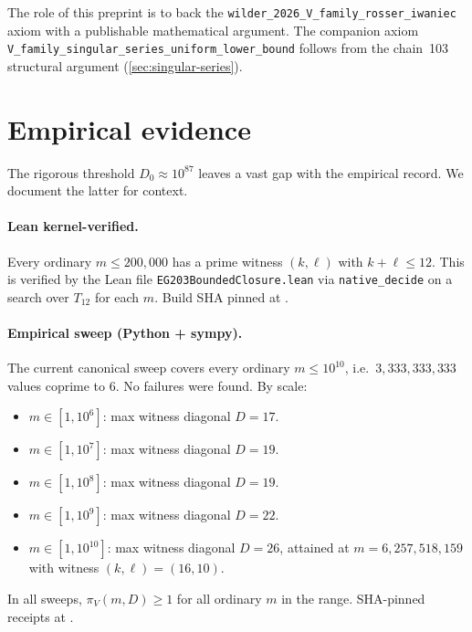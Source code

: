 \documentclass[11pt,a4paper]{article}
\theoremstyle{plain}
\theoremstyle{definition}
\theoremstyle{remark}
\begin{document}
The role of this preprint is to back the
\texttt{wilder\_2026\_V\_family\_rosser\_iwaniec} axiom with a
publishable mathematical argument. The companion axiom
\texttt{V\_family\_singular\_series\_uniform\_lower\_bound} follows
from the chain~103 structural argument
(\cref{sec:singular-series}).


\section{Empirical evidence}\label{sec:empirical}

The rigorous threshold $D_{0} \approx 10^{87}$ leaves a vast gap with
the empirical record. We document the latter for context.

\paragraph{Lean kernel-verified.}
Every ordinary $m \leq 200{,}000$ has a prime witness $(k, \ell)$
with $k + \ell \leq 12$. This is verified by the Lean file
\texttt{EG203BoundedClosure.lean} via \texttt{native\_decide} on a
search over $T_{12}$ for each $m$. Build SHA pinned at
\cite{WilderEG203Lean2026}.

\paragraph{Empirical sweep (Python + sympy).}
The current canonical sweep covers every ordinary $m \leq 10^{10}$,
i.e.\ $3{,}333{,}333{,}333$ values coprime to $6$. No failures were
found. By scale:
\begin{itemize}
  \item $m \in [1, 10^{6}]$: max witness diagonal $D = 17$.
  \item $m \in [1, 10^{7}]$: max witness diagonal $D = 19$.
  \item $m \in [1, 10^{8}]$: max witness diagonal $D = 19$.
  \item $m \in [1, 10^{9}]$: max witness diagonal $D = 22$.
  \item $m \in [1, 10^{10}]$: max witness diagonal $D = 26$, attained
    at $m = 6{,}257{,}518{,}159$ with witness $(k, \ell) = (16, 10)$.
\end{itemize}
In all sweeps, $\pi_{V}(m, D) \geq 1$ for all ordinary $m$ in the
range. SHA-pinned receipts at \cite{WilderEG203MasterLog}.
\end{document}
